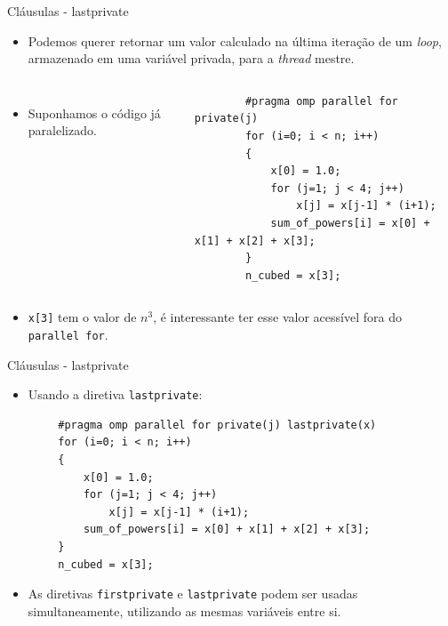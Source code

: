 \begin{frame}[fragile]{Cláusulas - lastprivate}
	\begin{itemize}
		\item Podemos querer retornar um valor calculado na última iteração de um \textit{loop}, armazenado em uma variável privada, para a \textit{thread} mestre.
	\end{itemize}
	\begin{columns}
			\begin{itemize}
				\item Suponhamos o código já paralelizado.
			\end{itemize}
		\begin{verbatim}
		#pragma omp parallel for private(j)
		for (i=0; i < n; i++)
		{
			x[0] = 1.0;
			for (j=1; j < 4; j++)
				x[j] = x[j-1] * (i+1);
			sum_of_powers[i] = x[0] + x[1] + x[2] + x[3];
		}
		n_cubed = x[3];
		\end{verbatim}
	\end{columns}
	\begin{itemize}
		\item \texttt{x[3]} tem o valor de $n^3$, é interessante ter esse valor acessível fora do \texttt{parallel for}.
	\end{itemize}
\end{frame}

\begin{frame}[fragile]{Cláusulas - lastprivate}
	\begin{itemize}
		\item Usando a diretiva \texttt{lastprivate}:
	\end{itemize}
	\begin{verbatim}
		#pragma omp parallel for private(j) lastprivate(x)
		for (i=0; i < n; i++)
		{
			x[0] = 1.0;
			for (j=1; j < 4; j++)
				x[j] = x[j-1] * (i+1);
			sum_of_powers[i] = x[0] + x[1] + x[2] + x[3];
		}
		n_cubed = x[3];
	\end{verbatim}
	\begin{itemize}
		\item As diretivas \texttt{firstprivate} e \texttt{lastprivate} podem ser usadas simultaneamente, utilizando as mesmas variáveis entre si.
	\end{itemize}
\end{frame}

